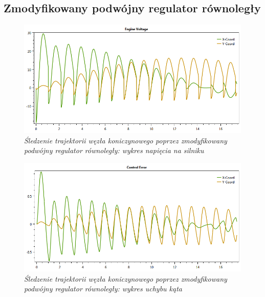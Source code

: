 \documentclass[12pt, oneside]{report}
\theoremstyle{definition}
\begin{document}
\begin{appendices}
\section{Zmodyfikowany podwójny regulator równoległy}
\begin{figure}[H]
	\centering
		\includegraphics[width = 400pt]{TrefoilKnotPDEV} 
		\caption{\textit{Śledzenie trajektorii węzła koniczynowego poprzez zmodyfikowany podwójny regulator równoległy: wykres napięcia na silniku}}
		\label{plot:TrefoilKnotPDEV}
\end{figure}

\begin{figure}[H]
	\centering
		\includegraphics[width = 400pt]{TrefoilKnotPDCE} 
		\caption{\textit{Śledzenie trajektorii węzła koniczynowego poprzez zmodyfikowany podwójny regulator równoległy: wykres uchybu kąta}}
		\label{plot:TrefoilKnotPDCE}
\end{figure}


\end{appendices}
\end{document}
